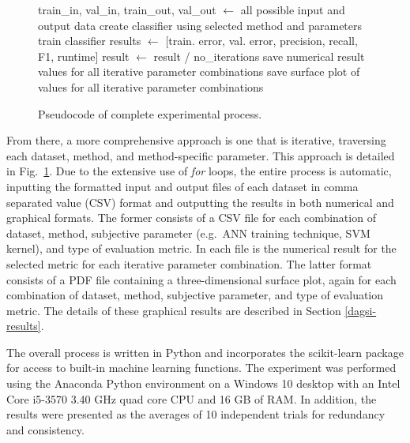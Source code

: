 \documentclass[12pt]{uthesis-v12}  %
\begin{document}
\begin{figure}
\begin{algorithmic}[1]
	\STATE train\_in, val\_in, train\_out, val\_out $\leftarrow$ all possible input and output data	
						\STATE create classifier using selected method and parameters
						\STATE train classifier
						\STATE results $\leftarrow$ [train. error, val. error, precision, recall, F1, runtime]
							\STATE result $\leftarrow$ result / no\_iterations
						\ENDFOR
					\ENDFOR
				\ENDFOR
					\STATE save numerical result values for all iterative parameter combinations
					\STATE save surface plot of values for all iterative parameter combinations
				\ENDFOR
			\ENDFOR
		\ENDFOR
	\ENDFOR
\ENDFOR
\label{full-alg-dagsi1}
\end{algorithmic}
\caption{Pseudocode of complete experimental process.} 
\label{full-alg-dagsi1}
\end{figure}

From there, a more comprehensive approach is one that is iterative, traversing each dataset, method, and method-specific parameter. This approach is detailed in Fig.~\ref{full-alg-dagsi1}. Due to the extensive use of \textit{for} loops, the entire process is automatic, inputting the formatted input and output files of each dataset in comma separated value (CSV) format and outputting the results in both numerical and graphical formats. The former consists of a CSV file for each combination of dataset, method, subjective parameter (e.g.~ANN training technique, SVM kernel), and type of evaluation metric. In each file is the numerical result for the selected metric for each iterative parameter combination. The latter format consists of a PDF file containing a three-dimensional surface plot, again for each combination of dataset, method, subjective parameter, and type of evaluation metric. The details of these graphical results are described in Section \ref{dagsi-results}.

The overall process is written in Python and incorporates the scikit-learn package \cite{pedregosa} for access to built-in machine learning functions. The experiment was performed using the Anaconda Python environment on a Windows 10 desktop with an Intel Core i5-3570 3.40 GHz quad core CPU and 16 GB of RAM. In addition, the results were presented as the averages of 10 independent trials for redundancy and consistency.
\end{document}
